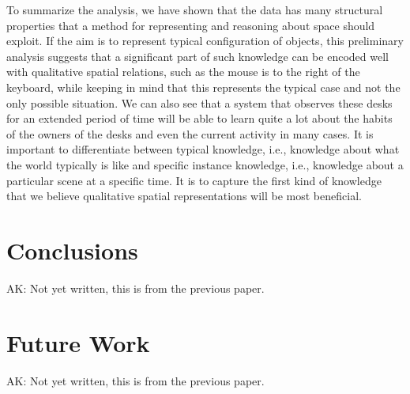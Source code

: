 \documentclass[letterpaper, 10 pt, conference]{ieeeconf}  %
\begin{document}
To summarize the analysis, we have shown that the data has many structural properties that a method for representing and reasoning about 
space should exploit. If the aim is to represent typical configuration of objects, this preliminary analysis suggests that a significant 
part of such knowledge can be encoded well with qualitative spatial relations, such as the mouse is to the right of the keyboard, while 
keeping in mind that this represents the typical case and not the only possible situation. We can also see that a system that observes these desks for 
an extended period of time will be able to learn quite a lot about the habits of the owners of the desks and even the current activity in 
many cases. It is important to differentiate between typical knowledge, i.e., knowledge about what the world typically is like and specific 
instance knowledge, i.e., knowledge about a particular scene at a specific time. It is to capture the first kind of knowledge that we 
believe  qualitative spatial representations will be most beneficial. 


\section{Conclusions}
\label{sec:Conclusions}
{\color{blue} AK: Not yet written, this is from the previous paper.}

\section{Future Work}
\label{sec:Future Work}
{\color{blue} AK: Not yet written, this is from the previous paper.}
\end{document}

